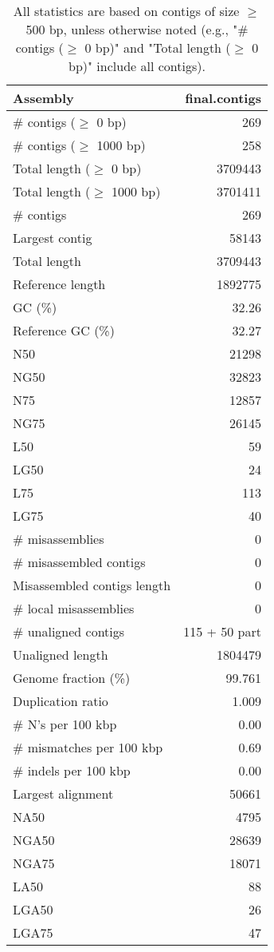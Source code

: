 \documentclass[12pt,a4paper]{article}
\begin{document}
\begin{table}[ht]
\begin{center}
\caption{All statistics are based on contigs of size $\geq$ 500 bp, unless otherwise noted (e.g., "\# contigs ($\geq$ 0 bp)" and "Total length ($\geq$ 0 bp)" include all contigs).}
\begin{tabular}{|l*{1}{|r}|}
\hline
Assembly & final.contigs \\ \hline
\# contigs ($\geq$ 0 bp) & 269 \\ \hline
\# contigs ($\geq$ 1000 bp) & 258 \\ \hline
Total length ($\geq$ 0 bp) & 3709443 \\ \hline
Total length ($\geq$ 1000 bp) & 3701411 \\ \hline
\# contigs & 269 \\ \hline
Largest contig & 58143 \\ \hline
Total length & 3709443 \\ \hline
Reference length & 1892775 \\ \hline
GC (\%) & 32.26 \\ \hline
Reference GC (\%) & 32.27 \\ \hline
N50 & 21298 \\ \hline
NG50 & 32823 \\ \hline
N75 & 12857 \\ \hline
NG75 & 26145 \\ \hline
L50 & 59 \\ \hline
LG50 & 24 \\ \hline
L75 & 113 \\ \hline
LG75 & 40 \\ \hline
\# misassemblies & 0 \\ \hline
\# misassembled contigs & 0 \\ \hline
Misassembled contigs length & 0 \\ \hline
\# local misassemblies & 0 \\ \hline
\# unaligned contigs & 115 + 50 part \\ \hline
Unaligned length & 1804479 \\ \hline
Genome fraction (\%) & 99.761 \\ \hline
Duplication ratio & 1.009 \\ \hline
\# N's per 100 kbp & 0.00 \\ \hline
\# mismatches per 100 kbp & 0.69 \\ \hline
\# indels per 100 kbp & 0.00 \\ \hline
Largest alignment & 50661 \\ \hline
NA50 & 4795 \\ \hline
NGA50 & 28639 \\ \hline
NGA75 & 18071 \\ \hline
LA50 & 88 \\ \hline
LGA50 & 26 \\ \hline
LGA75 & 47 \\ \hline
\end{tabular}
\end{center}
\end{table}
\end{document}
